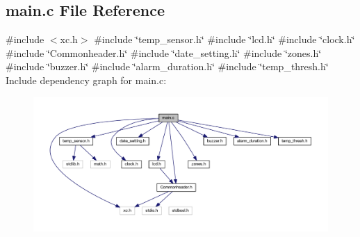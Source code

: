 \subsection{main.\+c File Reference}
\label{a00038}
{\ttfamily \#include $<$xc.\+h$>$}\newline
{\ttfamily \#include \char`\"{}temp\+\_\+sensor.\+h\char`\"{}}\newline
{\ttfamily \#include \char`\"{}lcd.\+h\char`\"{}}\newline
{\ttfamily \#include \char`\"{}clock.\+h\char`\"{}}\newline
{\ttfamily \#include \char`\"{}Commonheader.\+h\char`\"{}}\newline
{\ttfamily \#include \char`\"{}date\+\_\+setting.\+h\char`\"{}}\newline
{\ttfamily \#include \char`\"{}zones.\+h\char`\"{}}\newline
{\ttfamily \#include \char`\"{}buzzer.\+h\char`\"{}}\newline
{\ttfamily \#include \char`\"{}alarm\+\_\+duration.\+h\char`\"{}}\newline
{\ttfamily \#include \char`\"{}temp\+\_\+thresh.\+h\char`\"{}}\newline
Include dependency graph for main.\+c\+:
\nopagebreak
\begin{figure}[H]
\begin{center}
\leavevmode
\includegraphics[width=350pt]{a00039}
\end{center}
\end{figure}
